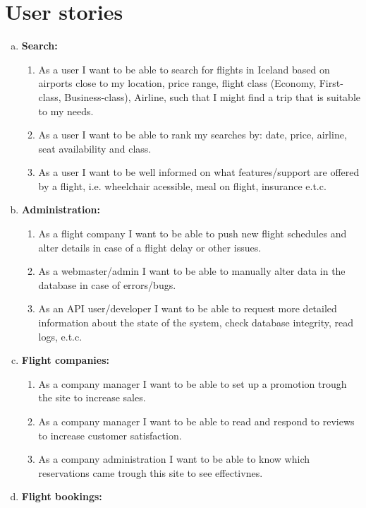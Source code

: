 \documentclass{fo}
\begin{document}
\section{User stories}
\begin{enumerate}[a.]
	\item
		
		\textbf{Search:}
		\begin{enumerate}[1.]
			\item
				As a user I want to be able to search for flights in Iceland based on airports close
				to my location, price range, flight class (Economy, First-class,
				Business-class), Airline, such that I might find a trip that is suitable to my needs.
			\item
				As a user I want to be able to rank my searches by: date, price, airline, seat availability and class.
			\item
				As a user I want to be well informed on what features/support are offered
				by a flight, i.e. wheelchair acessible, meal on flight, insurance e.t.c.
		\end{enumerate}
	\item
		\textbf{Administration:	}
		\begin{enumerate}[1.]
			\item
				As a flight company I want to be able to push new flight schedules and alter details in case of a flight delay or other issues.
			\item
				As a webmaster/admin I want to be able to manually alter data in the database in case of errors/bugs.
			\item
				As an API user/developer I want to be able to request more detailed information about
				the state of the system, check database integrity, read logs, e.t.c.
		\end{enumerate}
	\item
		\textbf{Flight companies:}
		\begin{enumerate}[1.]
			\item
				As a company manager I want to be able to set up a promotion trough the site to increase sales.
			\item
				As a company manager I want to be able to read and respond to reviews to increase customer satisfaction.
			\item
				As a company administration I want to be able to know which reservations came trough this site to see effectivnes.
		\end{enumerate}
	\item
		\textbf{Flight bookings:}

\end{enumerate}
\end{document}
